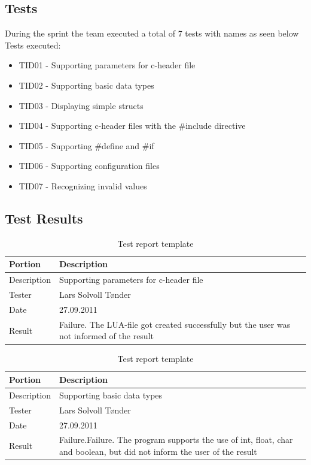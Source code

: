 \subsection{Tests}
During the sprint the team executed a total of 7 tests with names as seen below\\

\noindent Tests executed:

\begin{itemize}
\item TID01 - Supporting parameters for c-header file 
\item TID02 - Supporting basic data types
\item TID03 -  Displaying simple structs 
\item TID04 - Supporting c-header files with the \#include directive
\item TID05 - Supporting \#define and \#if
\item TID06 - Supporting configuration files
\item TID07 - Recognizing invalid values
\end{itemize}

\subsection{Test Results}

\begin{table}[ht] \small \center
\caption{Test report template \label{tab:testreport}}
\begin{tabular}{l l}
	\toprule
	Portion & Description \\
	\midrule
	Description & Supporting parameters for c-header file \\
	Tester & Lars Solvoll Tønder \\
	Date & 27.09.2011 \\
	Result & Failure. The LUA-file got created successfully but the user was not informed of the result \\
	\bottomrule
\end{tabular}
\end{table}

\begin{table}[ht] \small \center
\caption{Test report template \label{tab:testreport}}
\begin{tabular}{l l}
	\toprule
	Portion & Description \\
	\midrule
	Description & Supporting basic data types \\
	Tester & Lars Solvoll Tønder \\
	Date & 27.09.2011 \\
	Result & Failure.Failure. The program supports the use of int, float, char and boolean, but did not inform the user of the result\\
	\bottomrule
\end{tabular}
\end{table}


